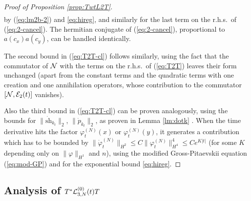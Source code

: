\documentclass[11pt,a4paper]{article}
\newcommand{\ekt}{e^{K\lvert t\rvert}}	%
\newcommand{\cE}{{\cal E}}
\newcommand{\cL}{{\cal L}}
\newcommand{\cN}{{\cal N}}
\newcommand{\norm}[1]{\lVert#1\rVert}	%
\begin{document}
\begin{proof}[Proof of Proposition \ref{prop:TwtL2T}]
\[\begin{split}
\end{split} \]
by (\ref{eq:lm2b-2}) and \eqref{eq:hireg}, and similarly for the last term on the r.h.s.\ of (\ref{eq:2-cancel}).
The hermitian conjugate of (\ref{eq:2-cancel}), proportional to $a (c_x) a (c_y)$, can be handled identically. 

The second bound in (\ref{eq:T2T-cl}) follows similarly, using the fact that the commutator of $\cN$ with the terms on the r.h.s.\ of (\ref{eq:T2T}) leaves their form unchanged (apart from the constant terms and the quadratic terms with one creation and one annihilation operators, whose contribution to the commutator $[\cN , \cE_2 (t)]$ vanishes).  

Also the third bound in (\ref{eq:T2T-cl}) can be proven analogously, using
the bounds for $\| \dot{\text{sh}}_{k_t} \|_2$, $\| \dot{p}_{k_t} \|_2$, as proven in Lemma \ref{lm:dotk} . When the time derivative hits the factor $\varphi_t^{(N)} (x)$ or $\varphi_t^{(N)} (y)$, it generates a contribution which has to be bounded by $\| \dot\varphi_t^{(N)} \|_{H^2} \leq C \| \varphi_t^{(N)} \|_{H^4}^4 \leq C \ekt$ (for some $K$ depending only on $\norm{\varphi}_{H^1}$ and $n$), using the modified Gross-Pitaevskii equation (\ref{eq:mod-GP}) and for the exponential bound \eqref{eq:hireg}. 
\end{proof}

\subsection{Analysis of $T^* \cL^{(0)}_{3,N} (t) T$}
\end{document}
